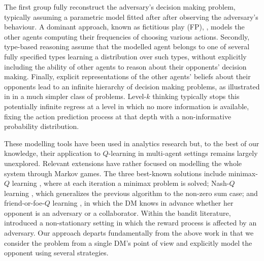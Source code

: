 The first group fully reconstruct the adversary's decision
making problem, typically assuming a parametric model fitted after 
after observing the adversary's behaviour. A dominant approach,
known as fictitious play  (FP), \cite{brown1951iterative}, models 
the other agents computing their frequencies of choosing various actions.
Secondly, %
type-based reasoning assume that the modelled agent belongs
to one of several fully specified types learning 
a distribution over such types, %
without explicitly including the ability of
other agents to reason about their opponents' decision making. 
Finally, explicit representations of the other agents' beliefs about their
opponents lead to an infinite hierarchy of decision making problems,
as illustrated in \cite{rios2012adversarial} in a much simpler class of problems. Level-$k$ thinking  \cite{stahl1994experimental} typically stops this potentially infinite regress at a level in which no more information is available, fixing the action prediction process at that depth with a non-informative probability distribution.

These modelling tools have been used in analytics 
research but, to the best
of our knowledge, their application to $Q$-learning in multi-agent settings remains 
largely unexplored. Relevant extensions %
have rather focused on modelling the whole system 
through Markov games. The three best-known solutions include minimax-$Q$ learning \cite{littman1994markov}, where at each iteration a minimax 
problem is solved; Nash-$Q$ learning \cite{hu2003nash}, 
which generalizes the previous algorithm to the non-zero sum case;
and friend-or-foe-$Q$ learning \cite{littman2001friend}, in which the DM knows in advance whether her opponent is an adversary or a collaborator. Within the bandit literature, \cite{auer1995gambling} introduced a non-stationary setting in which the reward process is affected by an adversary. Our approach departs fundamentally from the above
work in that we consider the problem from a single DM's point of view and 
explicitly model the opponent using several strategies.

